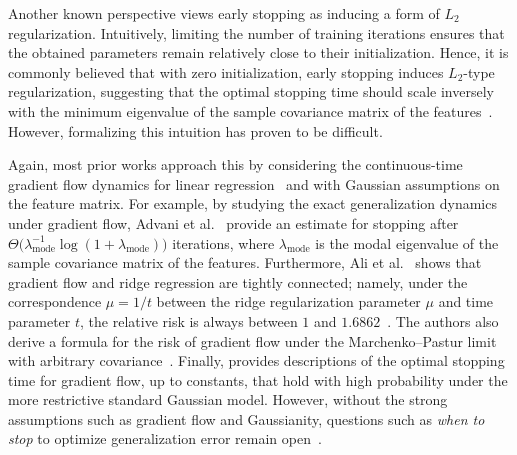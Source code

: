 \documentclass[11pt]{article}
\begin{document}
Another known perspective views early stopping as inducing a form of $L_2$ regularization. Intuitively, limiting the number of training iterations ensures that the obtained parameters remain relatively close to their initialization. Hence, it is commonly believed that with zero initialization, early stopping induces $L_2$-type regularization, suggesting that the optimal stopping time should scale inversely with the minimum eigenvalue of the sample covariance matrix of the features~\cite{goodfellow2016deep, hu2022early, raskutti2014early}. However, formalizing this intuition has proven to be difficult.

Again, most prior works approach this by considering the continuous-time gradient flow dynamics for linear regression~\cite{SkGoBr1994} and with Gaussian assumptions on the feature matrix. For example, by studying the exact generalization dynamics under gradient flow, Advani et al.~\cite{AdSaSo2020} provide an estimate for stopping after $\Theta\big(\lambda_{\text{mode}}^{-1}\log(1 + \lambda_{\text{mode}})\big)$ iterations, where $\lambda_{\text{mode}}$ is the modal eigenvalue of the sample covariance matrix of the features.
Furthermore, Ali et al.~\cite{ali2019continuous} shows that gradient flow and ridge regression are tightly connected; namely, under the correspondence $\mu = 1/t$ between the ridge regularization parameter $\mu$ and time parameter $t$, the relative risk is always between $1$ and $1.6862$~\cite[Theorems 1 and 2]{ali2019continuous}. The authors also derive a formula for the risk of gradient flow under the Marchenko--Pastur limit with arbitrary covariance~\cite[Theorem 5]{ali2019continuous}.
Finally, \cite{shen2022optimal} provides descriptions of the optimal stopping time for gradient flow, up to constants, that hold with high probability under the more restrictive standard Gaussian model.
However, without the strong assumptions such as gradient flow and Gaussianity, questions such as \emph{when to stop} to optimize generalization error remain open~\cite{AdSaSo2020, ali2019continuous, shen2022optimal, xu2023towards}. 
\end{document}
